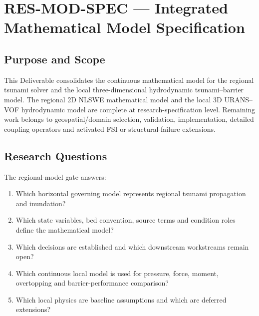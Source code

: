 
\section{RES-MOD-SPEC --- Integrated Mathematical Model Specification}
\label{sec:res-mod-spec}

\subsection{Purpose and Scope}
\label{sec:res-mod-spec-purpose}

This Deliverable consolidates the continuous mathematical model for the
regional tsunami solver and the local three-dimensional hydrodynamic
tsunami--barrier model. The regional 2D NLSWE mathematical model and
the local 3D URANS--VOF hydrodynamic model are complete at
research-specification level. Remaining work belongs to
geospatial/domain selection, validation, implementation, detailed
coupling operators and activated FSI or structural-failure extensions.

\subsection{Research Questions}
\label{sec:res-mod-spec-research-questions}

The regional-model gate answers:

\begin{enumerate}
  \item Which horizontal governing model represents regional tsunami
    propagation and inundation?
  \item Which state variables, bed convention, source terms and
    condition roles define the mathematical model?
  \item Which decisions are established and which downstream
    workstreams remain open?
  \item Which continuous local model is used for pressure, force,
    moment, overtopping and barrier-performance comparison?
  \item Which local physics are baseline assumptions and which are
    deferred extensions?
\end{enumerate}


